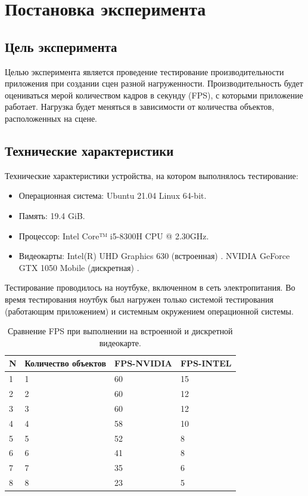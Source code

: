 \section{Постановка эксперимента}
\subsection{Цель эксперимента}

Целью эксперимента является проведение тестирование производительности приложения
при создании сцен разной нагруженности.  
Производительность будет оцениваться мерой количеством кадров в секунду (FPS), 
с которыми приложение работает.  
Нагрузка будет меняться в зависимости от количества объектов, расположенных на сцене.  

\subsection{Технические характеристики}

Технические характеристики устройства, на котором выполнялось тестирование:

\begin{itemize}
	\item Операционная система: Ubuntu 21.04 \cite{ubuntu} Linux \cite{linux} 64-bit.
	\item Память: 19.4 GiB.
	\item Процессор: Intel Core™ i5-8300H \cite{intel} CPU @ 2.30GHz.
	\item Видеокарты: 
  \subitem Intel(R) UHD Graphics 630 (встроенная) \cite{intel-graphics}.
  \subitem NVIDIA GeForce GTX 1050 Mobile (дискретная) \cite{nvidia-gtx1050m}.
\end{itemize}
Тестирование проводилось на ноутбуке, включенном в сеть электропитания. Во время тестирования ноутбук был нагружен только системой тестирования (работающим приложением) и системным окружением операционной системы.

\begin{table}[]
  \label{tb:comp_fps}
  \caption{Сравнение FPS при выполнении на встроенной и дискретной видеокарте.}
  \begin{tabular}{|l|l|l|l|}
  \hline
  N & Количество объектов & FPS-NVIDIA & FPS-INTEL \\
  \hline
  1 & 1                   & 60         & 15        \\
  2 & 2                   & 60         & 12        \\
  3 & 3                   & 60         & 12        \\
  4 & 4                   & 58         & 10        \\
  5 & 5                   & 52         & 8         \\
  6 & 6                   & 41         & 8         \\
  7 & 7                   & 35         & 6         \\
  8 & 8                   & 23         & 5        \\
  \hline
  \end{tabular}
\end{table}

